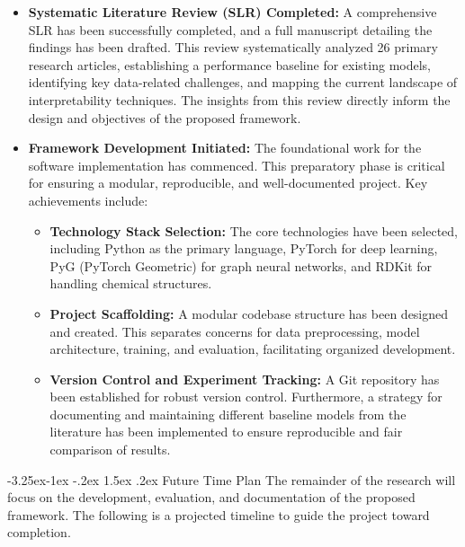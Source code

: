 \documentclass[12pt,a4paper]{article}
\makeatletter
\renewcommand\subsection{\@startsection{subsection}{2}{\z@}%
  {-3.25ex\@plus-1ex \@minus-.2ex}%
  {1.5ex \@plus.2ex}%
  {\normalfont\normalsize\bfseries}}
\makeatother
\begin{document}
\begin{itemize}
    \item \textbf{Systematic Literature Review (SLR) Completed:} A comprehensive SLR has been successfully completed, and a full manuscript detailing the findings has been drafted. This review systematically analyzed 26 primary research articles, establishing a performance baseline for existing models, identifying key data-related challenges, and mapping the current landscape of interpretability techniques. The insights from this review directly inform the design and objectives of the proposed framework.

    \item \textbf{Framework Development Initiated:} The foundational work for the software implementation has commenced. This preparatory phase is critical for ensuring a modular, reproducible, and well-documented project. Key achievements include:
    \begin{itemize}
        \item \textbf{Technology Stack Selection:} The core technologies have been selected, including Python as the primary language, PyTorch for deep learning, PyG (PyTorch Geometric) for graph neural networks, and RDKit for handling chemical structures.
        \item \textbf{Project Scaffolding:} A modular codebase structure has been designed and created. This separates concerns for data preprocessing, model architecture, training, and evaluation, facilitating organized development.
        \item \textbf{Version Control and Experiment Tracking:} A Git repository has been established for robust version control. Furthermore, a strategy for documenting and maintaining different baseline models from the literature has been implemented to ensure reproducible and fair comparison of results.
    \end{itemize}
\end{itemize}

\subsection{Future Time Plan}
The remainder of the research will focus on the development, evaluation, and documentation of the proposed framework. The following is a projected timeline to guide the project toward completion.
\end{document}
